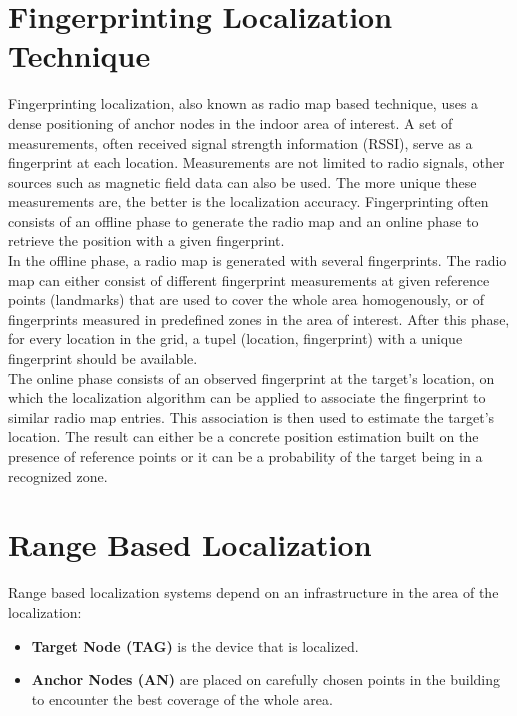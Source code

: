 \section{Fingerprinting Localization Technique}
Fingerprinting localization, also known as radio map based technique, uses a dense positioning of anchor nodes in the indoor area of interest. A set of measurements, often received signal strength information (RSSI), serve as a fingerprint at each location. Measurements are not limited to radio signals, other sources such as magnetic field data can also be used. The more unique these measurements are, the better is the localization accuracy. Fingerprinting often consists of an offline phase to generate the radio map and an online phase to retrieve the position with a given fingerprint.\\
\noindent\hspace*{5mm}%
In the offline phase, a radio map is generated with several fingerprints. The radio map can either consist of different fingerprint measurements at given reference points (landmarks) that are used to cover the whole area homogenously, or of fingerprints measured in predefined zones in the area of interest. After this phase, for every location in the grid, a tupel (location, fingerprint) with a unique fingerprint should be available.\\
\noindent\hspace*{5mm}%
The online phase consists of an observed fingerprint at the target's location, on which the localization algorithm can be applied to associate the fingerprint to similar radio map entries. This association is then used to estimate the target's location. The result can either be a concrete position estimation built on the presence of reference points or it can be a probability of the target being in a recognized zone. 


\section{Range Based Localization}

Range based localization systems depend on an infrastructure in the area of the localization:
\begin{itemize} 
\item \textbf{Target Node (TAG)} is the device that is localized. 
\item \textbf{Anchor Nodes (AN)} are placed on carefully chosen points in the building to encounter the best coverage of the whole area.
\end{itemize}

